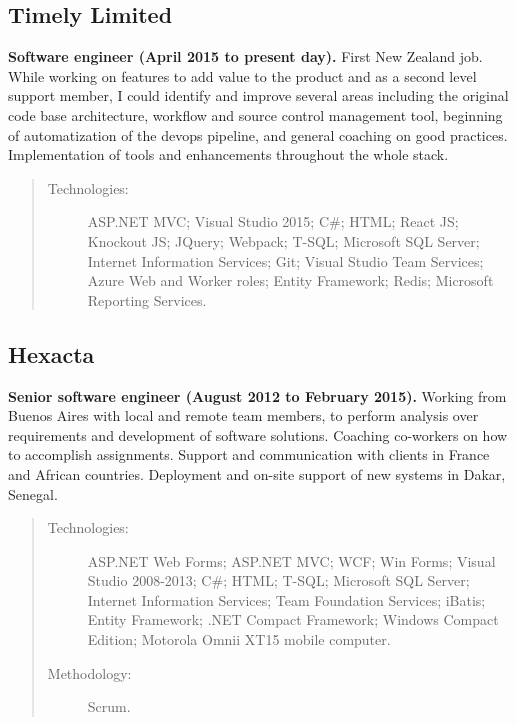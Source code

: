 \subsection*{Timely Limited}

\textbf{Software engineer (April 2015 to present day).} First New Zealand job. While working on features to add value to the product and as a second level support member, I could identify and improve several areas including the original code base architecture, workflow and source control management tool, beginning of automatization of the devops pipeline, and general coaching on good practices. Implementation of tools and enhancements throughout the whole stack.

\begin{quote}
\begin{description}
    \item[Technologies:] ASP.NET MVC; Visual Studio 2015; C\#; HTML; React JS; Knockout JS; JQuery; Webpack; T-SQL; Microsoft SQL Server; Internet Information Services; Git; Visual Studio Team Services; Azure Web and Worker roles; Entity Framework; Redis; Microsoft Reporting Services.
\end{description}
\end{quote}

\subsection*{Hexacta}

\textbf{Senior software engineer (August 2012 to February 2015).} Working from Buenos Aires with local and remote team members, to perform analysis over requirements and development of software solutions. Coaching co-workers on how to accomplish assignments. Support and communication with clients in France and African countries. Deployment and on-site support of new systems in Dakar, Senegal.

\begin{quote}
\begin{description}
    \item[Technologies:] ASP.NET Web Forms; ASP.NET MVC; WCF; Win Forms; Visual Studio 2008-2013; C\#; HTML; T-SQL; Microsoft SQL Server; Internet Information Services; Team Foundation Services; iBatis; Entity Framework; .NET Compact Framework; Windows Compact Edition; Motorola Omnii XT15 mobile computer.
    \item[Methodology:] Scrum.
\end{description}
\end{quote}

